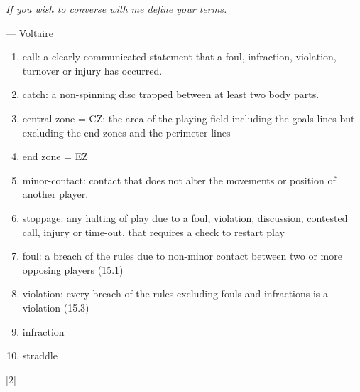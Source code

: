 \begin{flushright}
\begin{minipage}{9cm}
    \begin{flushleft} \emph{If you wish to converse with me define your terms.} \end{flushleft}
    \begin{flushright}--- Voltaire\end{flushright}
\end{minipage}
\end{flushright}

\small
\begin{enumerate}
    \item call: a clearly communicated statement that a foul, infraction, violation, turnover or injury has occurred.
    \item catch: a non-spinning disc trapped between at least two body parts.
    \item central zone = CZ: the area of the playing field including the goals lines but excluding the end zones and the perimeter lines
    \item end zone = EZ
    \item minor-contact: contact that does not alter the movements or position of another player.
    \item stoppage: any halting of play due to a foul, violation, discussion, contested call, injury or time-out, that requires a check to restart play
    \item foul: a breach of the rules due to non-minor contact between two or more opposing players (15.1)
    \item violation: every breach of the rules excluding fouls and infractions is a violation (15.3)
    \item infraction
    \item straddle
\end{enumerate}

\begin{center}[2]\end{center}
